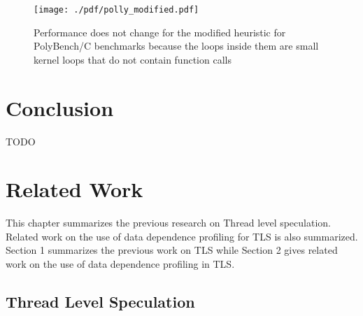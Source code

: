 \documentclass[10pt]{report}          %
\begin{document}
\begin{figure}[h]
\centering
\texttt{[image: ./pdf/polly\_modified.pdf]}
\caption{Performance does not change for the modified heuristic for PolyBench/C benchmarks because the loops inside them are small kernel loops that do not contain function calls}
\label{fig:poly_modified}
\end{figure}

\chapter{Conclusion}
\label{chapter:conclusion}

TODO
\chapter{Related Work}
\label{chapter:related work}

This chapter summarizes the previous research on Thread level speculation.  Related work on the use of data dependence profiling for TLS is also summarized.  Section 1 summarizes the previous work on TLS while Section 2 gives related work on the use of data dependence profiling in TLS.

\section{Thread Level Speculation}
\end{document}
